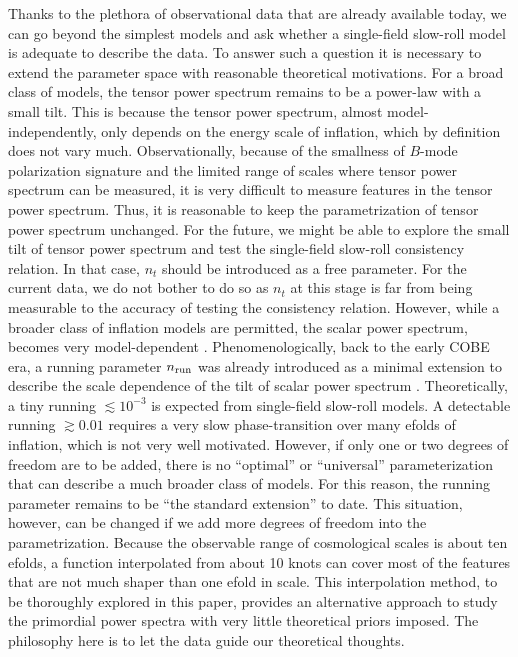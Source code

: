 \documentclass[a4paper,11pt]{article}
\begin{document}
Thanks to the plethora of observational data that are already available today, we can go beyond the simplest models and ask whether a single-field slow-roll model is adequate to describe the data. To answer such a question it is necessary to extend the parameter space with reasonable theoretical motivations. For a broad class of models, the tensor power spectrum remains to be a power-law with a small tilt. This is because the tensor power spectrum, almost model-independently, only depends on the energy scale of inflation, which by definition does not vary much. Observationally, because of the smallness of $B$-mode polarization signature and the limited range of scales where tensor power spectrum can be measured, it is very difficult to measure features in the tensor power spectrum. Thus, it is reasonable to keep the parametrization of tensor power spectrum unchanged. For the future, we might be able to explore the small tilt of tensor power spectrum and test the single-field slow-roll consistency relation. In that case, $n_t$ should be introduced as a free parameter. For the current data, we do not bother to do so as $n_t$ at this stage is far from being measurable to the accuracy of testing the consistency relation. However, while a broader class of inflation models are permitted, the scalar power spectrum, becomes very model-dependent \cite{Linde1996, Starobinsky1998, Lyth2003, Barnaby2009b, Bond2009}. Phenomenologically, back to the early COBE era, a running parameter $n_{\rm run}$ was already introduced as a minimal extension to describe the scale dependence of the tilt of scalar power spectrum \cite{Kosowsky1995}. Theoretically, a tiny running $\lesssim 10^{-3}$ is expected from  single-field slow-roll models. A detectable running $\gtrsim 0.01$ requires a very slow phase-transition over many efolds of inflation, which is not very well motivated. However, if only one or two degrees of freedom are to be added, there is no ``optimal'' or ``universal'' parameterization that can describe a much broader class of models. For this reason, the running parameter remains to be ``the standard extension'' to date. This situation, however, can be changed if we add more degrees of freedom into the parametrization. Because the observable range of cosmological scales is about ten efolds, a function interpolated from about 10 knots can cover most of the features that are not much shaper than one efold in scale. This interpolation method, to be thoroughly explored in this paper, provides an alternative approach to study the primordial power spectra with very little theoretical priors imposed. The philosophy here is to let the data guide our theoretical thoughts.
\end{document}
